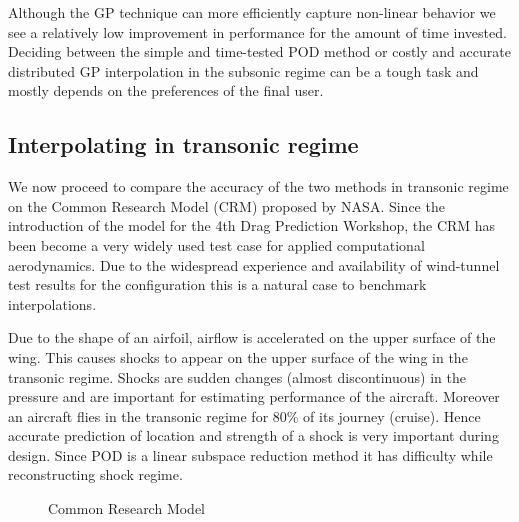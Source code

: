 Although the GP technique can more efficiently capture non-linear behavior we see a relatively low improvement in performance for the amount of time invested. Deciding between the simple and time-tested POD method or costly and accurate distributed GP interpolation in the subsonic regime can be a tough task and mostly depends on the preferences of the final user.

\subsection{Interpolating in transonic regime}\label{subSec:resultsCRM}
We now proceed to compare the accuracy of the two methods in transonic regime on the Common Research Model (CRM)  proposed by NASA. Since the introduction of the model for the 4th Drag Prediction Workshop, the CRM has been become a very widely used test case for applied computational aerodynamics. Due to the widespread experience and availability of wind-tunnel test results for the configuration this is a natural case to benchmark interpolations. 

Due to the shape of an airfoil, airflow is accelerated on the upper surface of the wing. This causes shocks to appear on the upper surface of the wing in the transonic regime. Shocks are sudden changes (almost discontinuous) in the pressure and are important for estimating performance of the aircraft. Moreover an aircraft flies in the transonic regime for 80\% of its journey (cruise). Hence accurate prediction of location and strength of a shock is very important during design. Since POD is a linear subspace reduction method it has difficulty while reconstructing shock regime.

\begin{figure}[!ht]
  \centering
  \quad
  \caption{Common Research Model}
\end{figure}

